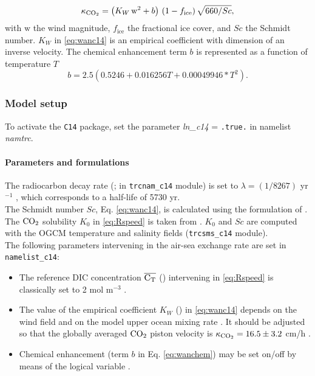 \documentclass[../main/TOP_manual]{subfiles}
\begin{document}
\begin{equation}
\kappa_{\mathrm{CO_2}}=\left( K_W\,\mathrm{w}^2 + b  \right)\, (1-f_\mathrm{ice})\,\sqrt{660/Sc}, \label{eq:wanc14}
\end{equation}
with $\mathrm{w}$ the wind magnitude, $f_\mathrm{ice}$ the fractional ice cover, and $Sc$ the Schmidt number.
$K_W$ in \autoref{eq:wanc14} is an empirical coefficient with dimension of an inverse velocity.
The chemical enhancement term $b$ is represented as a function of temperature $T$ \citep{wanninkhof_1992}
\begin{equation}
b=2.5 ( 0.5246 + 0.016256 T+ 0.00049946  * T^2 ). \label{eq:wanchem}
\end{equation}


%
\subsubsection{Model setup}
\label{sec:setup}

To activate the \texttt{C14} package, set the parameter \textit{ln\_c14} = \texttt{.true.} in namelist \textit{namtrc}.

\paragraph{Parameters and formulations}
\label{sec:param}
The radiocarbon decay rate (; in \texttt{trcnam\_c14} module) is set to $\lambda=(1/8267)$ yr$^{-1}$ \citep{stuiver_1977}, which corresponds to a half-life of 5730 yr.\\[1pt]
%
The Schmidt number $Sc$, Eq. \autoref{eq:wanc14}, is calculated using the formulation of \cite{wanninkhof_2014}.
The $\mathrm{CO_2}$ solubility $K_0$ in \autoref{eq:Rspeed} is taken from \cite{weiss_1974}. $K_0$ and $Sc$ are computed with the OGCM temperature and salinity fields (\texttt{trcsms\_c14} module).\\[1pt]
%
The following parameters intervening in the air-sea exchange rate are set in \texttt{namelist\_c14}:

\begin{itemize}
\item The reference DIC concentration $\overline{\mathrm{C_T}}$ () intervening in \autoref{eq:Rspeed} is classically set to 2 mol m$^{-3}$ \citep{toggweiler_1989a,orr_2001,butzin_2005}.
%
\item The value of the empirical coefficient $K_W$ () in \autoref{eq:wanc14} depends on the wind field and on the model upper ocean mixing rate \citep{toggweiler_1989a,wanninkhof_1992,naegler_2009,wanninkhof_2014}.
It should be adjusted so that the globally averaged $\mathrm{CO_2}$ piston velocity is $\kappa_{\mathrm{CO_2}} = 16.5\pm 3.2$ cm/h \citep{naegler_2009}.
%
\item Chemical enhancement (term $b$  in Eq. \autoref{eq:wanchem}) may be set on/off by means of the logical variable .
\end{itemize}
\end{document}
